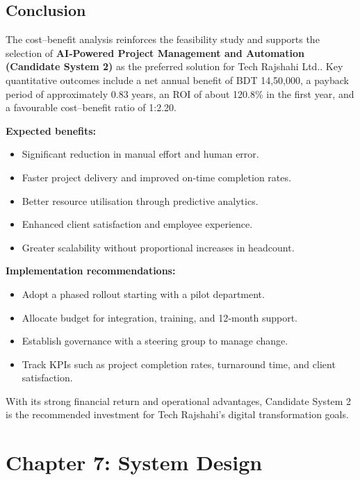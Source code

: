 \documentclass[12pt,a4paper]{article}
\newcommand{\company}[1]{#1}
\begin{document}
\subsection{Conclusion}
The cost–benefit analysis reinforces the feasibility study and supports the selection of \textbf{AI‑Powered Project Management and Automation (Candidate System 2)} as the preferred solution for \company{Tech Rajshahi Ltd.}.  
Key quantitative outcomes include a net annual benefit of BDT 14,50,000, a payback period of approximately 0.83 years, an ROI of about 120.8\% in the first year, and a favourable cost–benefit ratio of 1:2.20.
\newline

\textbf{Expected benefits:}
\begin{itemize}
    \item Significant reduction in manual effort and human error.
    \item Faster project delivery and improved on‑time completion rates.
    \item Better resource utilisation through predictive analytics.
    \item Enhanced client satisfaction and employee experience.
    \item Greater scalability without proportional increases in headcount.
\end{itemize}

\textbf{Implementation recommendations:}
\begin{itemize}
    \item Adopt a phased rollout starting with a pilot department.
    \item Allocate budget for integration, training, and 12‑month support.
    \item Establish governance with a steering group to manage change.
    \item Track KPIs such as project completion rates, turnaround time, and client satisfaction.
\end{itemize}

With its strong financial return and operational advantages, Candidate System 2 is the recommended investment for Tech Rajshahi's digital transformation goals.

\newpage
\section{Chapter 7: System Design}
\end{document}
